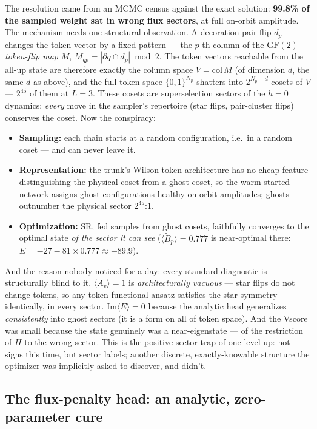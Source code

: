 \documentclass[11pt]{article}
\newcommand{\Av}{A_v}
\newcommand{\Bt}{\tilde B_p}
\newcommand{\GF}{\mathrm{GF}(2)}
\begin{document}
The resolution came from an MCMC census against the exact solution:
\textbf{99.8\% of the sampled weight sat in wrong flux sectors}, at full
on-orbit amplitude. The mechanism needs one structural observation. A
decoration-pair flip $d_p$ changes the token vector by a fixed pattern --- the
$p$-th column of the $\GF$ \emph{token-flip map} $M$,
$M_{qp}=|\partial q\cap d_p| \bmod 2$. The token vectors reachable from the
all-up state are therefore exactly the column space $V=\mathrm{col}\,M$ (of
dimension $d$, the same $d$ as above), and the full token space
$\{0,1\}^{N_p}$ shatters into $2^{N_p-d}$ cosets of $V$ --- $2^{45}$ of them at
$L=3$. These cosets are superselection sectors of the $h=0$ dynamics:
\emph{every} move in the sampler's repertoire (star flips, pair-cluster
flips) conserves the coset. Now the conspiracy:
\begin{itemize}
\item \textbf{Sampling:} each chain starts at a random configuration, i.e.\
in a random coset --- and can never leave it.
\item \textbf{Representation:} the trunk's Wilson-token architecture has no
cheap feature distinguishing the physical coset from a ghost coset, so the
warm-started network assigns ghost configurations healthy on-orbit
amplitudes; ghosts outnumber the physical sector $2^{45}$:$1$.
\item \textbf{Optimization:} SR, fed samples from ghost cosets, faithfully
converges to the optimal state \emph{of the sector it can see}
($\langle\Bt\rangle=0.777$ is near-optimal there:
$E=-27-81\times0.777\approx-89.9$).
\end{itemize}
And the reason nobody noticed for a day: every standard diagnostic is
structurally blind to it. $\langle\Av\rangle=1$ is \emph{architecturally
vacuous} --- star flips do not change tokens, so any token-functional ansatz
satisfies the star symmetry identically, in every sector.
$\mathrm{Im}\langle E\rangle=0$ because the analytic head generalizes
\emph{consistently} into ghost sectors (it is a form on all of token space).
And the Vscore was small because the state genuinely was a near-eigenstate ---
of the restriction of $H$ to the wrong sector. This is the positive-sector
trap of \cite{SignNote} one level up: not signs this time, but sector labels;
another discrete, exactly-knowable structure the optimizer was implicitly
asked to discover, and didn't.

\subsection{The flux-penalty head: an analytic, zero-parameter cure}
\label{sec:fluxpenalty}
\end{document}
